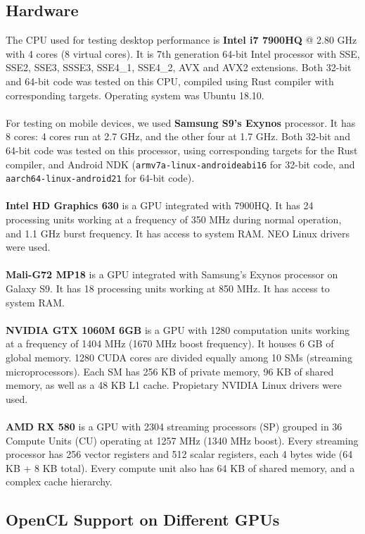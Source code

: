 \subsection{Hardware}
The CPU used for testing desktop performance is \textbf{Intel i7 7900HQ} @ 2.80 GHz with 4 cores (8 virtual cores). It is 7th generation 64-bit Intel processor with SSE, SSE2, SSE3, SSSE3, SSE4\_1, SSE4\_2, AVX and AVX2 extensions. Both 32-bit and 64-bit code was tested on this CPU, compiled using Rust compiler with corresponding targets. Operating system was Ubuntu 18.10.\\
\\
For testing on mobile devices, we used \textbf{Samsung S9's Exynos} processor. It has 8 cores: 4 cores run at 2.7 GHz, and the other four at 1.7 GHz. Both 32-bit and 64-bit code was tested on this processor, using corresponding targets for the Rust compiler, and Android NDK (\texttt{armv7a-linux-androideabi16} for 32-bit code, and \texttt{aarch64-linux-android21} for 64-bit code).\\
\\
\textbf{Intel HD Graphics 630} is a GPU integrated with 7900HQ. It has 24 processing units working at a frequency of 350 MHz during normal operation, and 1.1 GHz burst frequency. It has access to system RAM. NEO Linux drivers were used.\\
\\
\textbf{Mali-G72 MP18} is a GPU integrated with Samsung's Exynos processor on Galaxy S9. It has 18 processing units working at 850 MHz. It has access to system RAM.\\
\\
\textbf{NVIDIA GTX 1060M 6GB} is a GPU with 1280 computation units working at a frequency of 1404 MHz (1670 MHz boost frequency). It houses 6 GB of global memory. 1280 CUDA cores are divided equally among 10 SMs (streaming microprocessors). Each SM has 256 KB of private memory, 96 KB of shared memory, as well as a 48 KB L1 cache. Propietary NVIDIA Linux drivers were used.\\
\\
\textbf{AMD RX 580} is a GPU with 2304 streaming processors (SP) grouped in 36 Compute Units (CU) operating at 1257 MHz (1340 MHz boost). Every streaming processor has 256 vector registers and 512 scalar registers, each 4 bytes wide (64 KB + 8 KB total). Every compute unit also has 64 KB of shared memory, and a complex cache hierarchy.\\

\subsection{OpenCL Support on Different GPUs}

